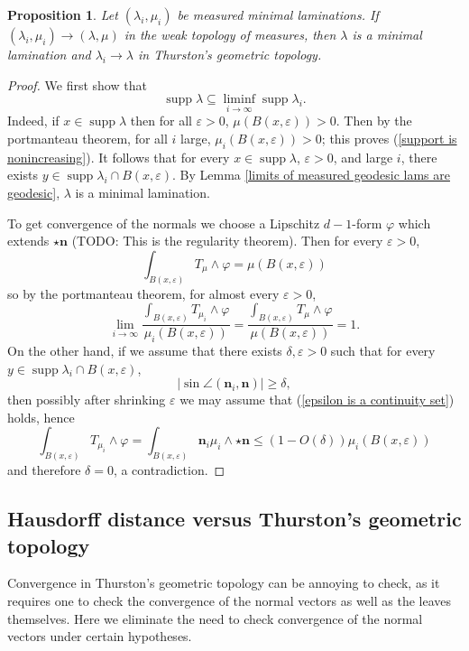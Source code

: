 \documentclass[reqno,11pt]{amsart}
\DeclareMathOperator{\supp}{supp}
\newcommand{\normal}{\mathbf n}
\newtheorem{proposition}[theorem]{Proposition}
\theoremstyle{definition}
\numberwithin{equation}{section}
\begin{document}
\begin{proposition}\label{measured implies Thurston}
Let $(\lambda_i, \mu_i)$ be measured minimal laminations.
If $(\lambda_i, \mu_i) \to (\lambda, \mu)$ in the weak topology of measures, then $\lambda$ is a minimal lamination and $\lambda_i \to \lambda$ in Thurston's geometric topology.
\end{proposition}
\begin{proof}
We first show that
\begin{equation}\label{support is nonincreasing}
	\supp \lambda \subseteq \liminf_{i \to \infty} \supp \lambda_i.
\end{equation}
Indeed, if $x \in \supp \lambda$ then for all $\varepsilon > 0$, $\mu(B(x, \varepsilon)) > 0$.
Then by the portmanteau theorem, for all $i$ large, $\mu_i(B(x, \varepsilon)) > 0$; this proves (\ref{support is nonincreasing}).
It follows that for every $x \in \supp \lambda$, $\varepsilon > 0$, and large $i$, there exists $y \in \supp \lambda_i \cap B(x, \varepsilon)$.
By Lemma \ref{limits of measured geodesic lams are geodesic}, $\lambda$ is a minimal lamination.

To get convergence of the normals we choose a Lipschitz $d-1$-form $\varphi$ which extends $\star \normal$ (TODO: This is the regularity theorem).
Then for every $\varepsilon > 0$,
$$\int_{B(x, \varepsilon)} T_\mu \wedge \varphi = \mu(B(x, \varepsilon))$$
so by the portmanteau theorem, for almost every $\varepsilon > 0$,
\begin{equation}\label{epsilon is a continuity set}
	\lim_{i \to \infty} \frac{\int_{B(x, \varepsilon)} T_{\mu_i} \wedge \varphi}{\mu_i(B(x, \varepsilon))} = \frac{\int_{B(x, \varepsilon)} T_\mu \wedge \varphi}{\mu(B(x, \varepsilon))} = 1.
\end{equation}
On the other hand, if we assume that there exists $\delta, \varepsilon > 0$ such that for every $y \in \supp \lambda_i \cap B(x, \varepsilon)$,
$$|\sin \angle(\normal_i, \normal)| \geq \delta,$$
then possibly after shrinking $\varepsilon$ we may assume that (\ref{epsilon is a continuity set}) holds, hence
$$\int_{B(x, \varepsilon)} T_{\mu_i} \wedge \varphi = \int_{B(x, \varepsilon)} \normal_i\mu_i \wedge \star \normal \leq (1 - O(\delta)) \mu_i(B(x, \varepsilon))$$
and therefore $\delta = 0$, a contradiction.
\end{proof}


\subsection{Hausdorff distance versus Thurston's geometric topology}
Convergence in Thurston's geometric topology can be annoying to check, as it requires one to check the convergence of the normal vectors as well as the leaves themselves.
Here we eliminate the need to check convergence of the normal vectors under certain hypotheses.
\end{document}
